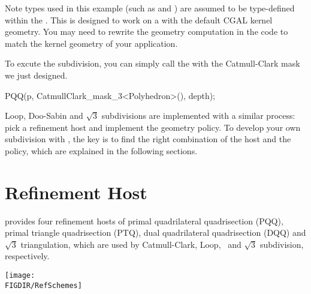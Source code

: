 Note types used in this example (such as  and
) are assumed to be type-defined within the
. This  is designed
to work on a  with the default CGAL 
kernel geometry. You may need to rewrite the geometry computation
in the code to match the kernel geometry of your application.

To excute the subdivision, you can 
simply call the  with the Catmull-Clark mask
we just designed.

\begin{ccExampleCode}
PQQ(p, CatmullClark_mask_3<Polyhedron>(), depth);
\end{ccExampleCode}


Loop, Doo-Sabin and $\sqrt{3}$ subdivisions are implemented 
with a similar process: pick a refinement host and implement 
the geometry policy. To develop your own subdivision with 
, the key is 
to find the right combination of the host and the policy, 
which are explained in the following sections.

\section{Refinement Host}
\label{secRefHost}
 provides four refinement hosts of primal 
quadrilateral quadrisection (PQQ), primal triangle 
quadrisection (PTQ), dual quadrilateral 
quadrisection (DQQ) and $\sqrt{3}$ triangulation, which 
are used by Catmull-Clark, Loop, \DS\ and $\sqrt{3}$ subdivision, 
respectively. 

\begin{ccTexOnly}
  \begin{center}
    \parbox{0.6\textwidth}{%
      \texttt{[image: \\FIGDIR/RefSchemes]}%
    }\\ \vspace{0.5cm}
  \end{center}
\end{ccTexOnly}

